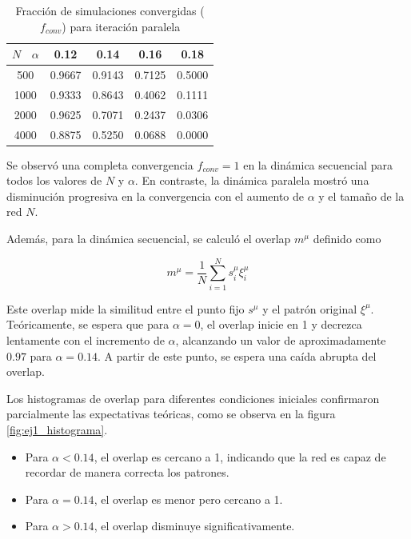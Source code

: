 \documentclass[aps,prb,twocolumn,superscriptaddress,floatfix,longbibliography]{revtex4-2}
\newcounter{para}
\begin{document}
\begin{table}[h]
  \centering
  \caption{Fracción de simulaciones convergidas (\( f_{conv} \)) para iteración paralela}
  \label{tab:ej1_f_conv_paralela}
  \begin{tabular}{|c|c|c|c|c|}
  \hline
  \( N \) \ \( \alpha \) & 0.12   & 0.14   & 0.16   & 0.18   \\ \hline
  500            & 0.9667 & 0.9143 & 0.7125 & 0.5000 \\ \hline
  1000           & 0.9333 & 0.8643 & 0.4062 & 0.1111 \\ \hline
  2000           & 0.9625 & 0.7071 & 0.2437 & 0.0306 \\ \hline
  4000           & 0.8875 & 0.5250 & 0.0688 & 0.0000 \\ \hline
  \end{tabular}
\end{table}
  

Se observó una completa convergencia $f_{conv} = 1$ en la dinámica secuencial para todos los valores de \( N \) y \( \alpha \). En contraste, la dinámica paralela mostró una disminución progresiva en la convergencia con el aumento de \( \alpha \) y el tamaño de la red \( N \).

Además, para la dinámica secuencial, se calculó el overlap \( m^{\mu} \) definido como

\[ m^{\mu} = \frac{1}{N} \sum_{i=1}^{N} s_i^{\mu} \xi_i^{\mu} \]

Este overlap mide la similitud entre el punto fijo \( s^{\mu} \) y el patrón original \( \xi^{\mu} \). Teóricamente, se espera que para \( \alpha = 0 \), el overlap inicie en 1 y decrezca lentamente con el incremento de \( \alpha \), alcanzando un valor de aproximadamente $0.97$ para \( \alpha = 0.14 \). A partir de este punto, se espera una caída abrupta del overlap.

Los histogramas de overlap para diferentes condiciones iniciales confirmaron parcialmente las expectativas teóricas, como se observa en la figura \ref{fig:ej1_histograma}.
\begin{itemize}
  \item Para \( \alpha < 0.14 \), el overlap es cercano a 1, indicando que la red es capaz de recordar de manera correcta los patrones.
  \item Para \( \alpha = 0.14 \), el overlap es menor pero cercano a 1.
  \item Para \( \alpha > 0.14 \), el overlap disminuye significativamente.
\end{itemize}
\end{document}
